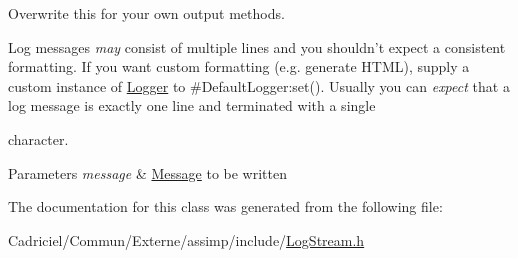 Overwrite this for your own output methods. 

Log messages {\itshape may} consist of multiple lines and you shouldn't expect a consistent formatting. If you want custom formatting (e.\-g. generate H\-T\-M\-L), supply a custom instance of \hyperlink{class_assimp_1_1_logger}{Logger} to \#\-Default\-Logger\-:set(). Usually you can {\itshape expect} that a log message is exactly one line and terminated with a single \par
 character. 
\begin{DoxyParams}{Parameters}
{\em message} & \hyperlink{class_message}{Message} to be written \\
\hline
\end{DoxyParams}


The documentation for this class was generated from the following file\-:\begin{DoxyCompactItemize}
\item 
Cadriciel/\-Commun/\-Externe/assimp/include/\hyperlink{_log_stream_8h}{Log\-Stream.\-h}\end{DoxyCompactItemize}
